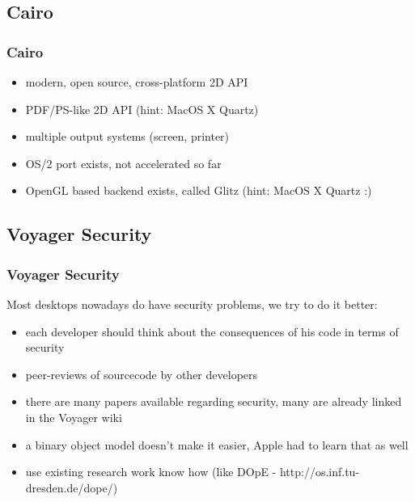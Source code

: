 \documentclass{beamer}
\begin{document}
\subsection{Cairo}
\begin{frame}
\frametitle{Cairo}
\begin{itemize}
  \item modern, open source, cross-platform 2D API
  \item PDF/PS-like 2D API (hint: MacOS X Quartz)
  \item multiple output systems (screen, printer)
  \item OS/2 port exists, not accelerated so far
  \item OpenGL based backend exists, called Glitz (hint: MacOS X Quartz :)
\end{itemize}
\end{frame}

\subsection{Voyager Security}
\begin{frame}
\frametitle{Voyager Security}
Most desktops nowadays do have security problems, we try to do it better:
\begin{itemize}
  \item each developer should think about the consequences of his code in terms of security
  \item peer-reviews of sourcecode by other developers
  \item there are many papers available regarding security, many are already linked in the Voyager wiki
  \item a binary object model doesn't make it easier, Apple had to learn that as well
  \item use existing research work know how (like DOpE - http://os.inf.tu-dresden.de/dope/)
\end{itemize}
\end{frame}
\end{document}
